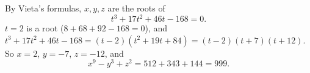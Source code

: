 By Vieta's formulas, $x,y,z$ are the roots of
\[t^3+17t^2+46t-168=0.\]
$t=2$ is a root ($8+68+92-168=0$), and $t^3+17t^2+46t-168=(t-2)(t^2+19t+84)=(t-2)(t+7)(t+12)$. So $x=2$, $y=-7$, $z=-12$, and
\[x^9-y^3+z^2=512+343+144=\boxed{999}.\]
